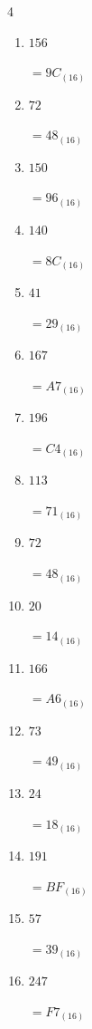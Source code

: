 \begin{multicols}{4}
\begin{enumerate}
  \item $156$

        $=9C_{(16)}$

  \item $72$

        $=48_{(16)}$

  \item $150$

        $=96_{(16)}$

\columnbreak %

\resetques

  \item $140$

        $=8C_{(16)}$

  \item $41$

        $=29_{(16)}$

  \item $167$

        $=A7_{(16)}$

  \item $196$

        $=C4_{(16)}$

  \item $113$

        $=71_{(16)}$

  \item $72$

        $=48_{(16)}$

  \item $20$

        $=14_{(16)}$

  \item $166$

        $=A6_{(16)}$

  \item $73$

        $=49_{(16)}$

  \item $24$

        $=18_{(16)}$

  \item $191$

        $=BF_{(16)}$

  \item $57$

        $=39_{(16)}$

  \item $247$

        $=F7_{(16)}$


\end{enumerate}
\end{multicols}
